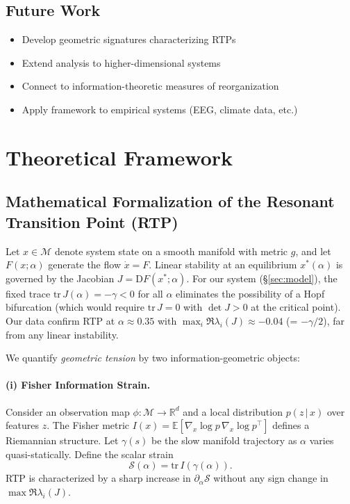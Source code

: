\documentclass[11pt,twocolumn]{article}
\begin{document}
\subsection{Future Work}

\begin{itemize}
  \item Develop geometric signatures characterizing RTPs
  \item Extend analysis to higher-dimensional systems
  \item Connect to information-theoretic measures of reorganization
  \item Apply framework to empirical systems (EEG, climate data, etc.)
\end{itemize}

\section{Theoretical Framework}

\subsection{Mathematical Formalization of the Resonant Transition Point (RTP)}
\label{sec:rtp-formal}

Let $x\in\mathcal{M}$ denote system state on a smooth manifold with metric $g$, and let $F(x;\alpha)$ generate the flow $\dot{x}=F$. Linear stability at an equilibrium $x^\ast(\alpha)$ is governed by the Jacobian $J=\mathrm{D}F(x^\ast;\alpha)$. For our system (\S\ref{sec:model}), the fixed trace $\mathrm{tr}\,J(\alpha) = -\gamma < 0$ for all $\alpha$ eliminates the possibility of a Hopf bifurcation (which would require $\mathrm{tr}\,J=0$ with $\det J>0$ at the critical point). Our data confirm RTP at $\alpha\approx0.35$ with $\max_i \Re\lambda_i(J) \approx -0.04$ (= $-\gamma/2$), far from any linear instability.

We quantify \emph{geometric tension} by two information-geometric objects:

\paragraph{(i) Fisher Information Strain.}
Consider an observation map $\phi:\mathcal{M}\to\mathbb{R}^d$ and a local distribution $p(z\,|\,x)$ over features $z$. The Fisher metric $I(x)=\mathbb{E}[\nabla_x \log p \,\nabla_x \log p^\top]$ defines a Riemannian structure. Let $\gamma(s)$ be the slow manifold trajectory as $\alpha$ varies quasi-statically. Define the scalar strain
\[
\mathcal{S}(\alpha)=\mathrm{tr}\,I\!\left(\gamma(\alpha)\right).
\]
RTP is characterized by a sharp increase in $\partial_\alpha \mathcal{S}$ without any sign change in $\max \Re\lambda_i(J)$.
\end{document}
